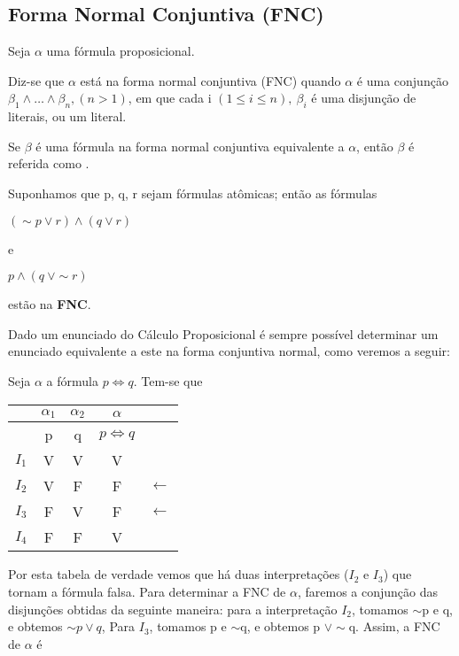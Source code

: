 \subsection{Forma Normal Conjuntiva (FNC)}

Seja $\alpha$ uma fórmula proposicional.

\begin{defi}
    Diz-se que $\alpha$ está na forma normal conjuntiva (FNC) quando $\alpha$ é uma conjunção $\beta_1 \land \dots \land \beta_n, (n > 1)$, em que cada i $(1 \leq i \leq n),\ \beta_i$ é uma disjunção de literais, ou um literal.
\end{defi}

\begin{defi}
    Se $\beta$ é uma fórmula na forma normal conjuntiva equivalente a $\alpha$, então $\beta$ é referida como .
\end{defi}

\setcounter{exemplo}{0}
\begin{exemplo}
    Suponhamos que p, q, r sejam fórmulas atômicas; então as fórmulas
    \begin{center}
        $(\sim p \lor r) \land (q \lor r)$

        e

        $p \land (q\ \lor \sim r)$
    \end{center}
\end{exemplo}

estão na \textbf{FNC}.

Dado um enunciado do Cálculo Proposicional é sempre possível determinar um enunciado equivalente a este na forma conjuntiva normal, como veremos a seguir:

\begin{exemplo}
    Seja $\alpha$ a fórmula $p \iff q$.
    Tem-se que
\end{exemplo}

\begin{tabular}{c | c c c l}
    & $\alpha_1$ & $\alpha_2$ & $\alpha$ & \\ \hline
    & p & q & $p \iff q$ & \\
    $I_1$ & V & V & V & \\
    $I_2$ & V & F & F & $\longleftarrow$ \\
    $I_3$ & F & V & F & $\longleftarrow$ \\
    $I_4$ & F & F & V &
\end{tabular}

\bigskip
Por esta tabela de verdade vemos que há duas interpretações ($I_2$ e $I_3$) que tornam a fórmula falsa.
Para determinar a FNC de $\alpha$, faremos a conjunção das disjunções obtidas da seguinte maneira: para a interpretação $I_2$, tomamos $\sim$p e q, e obtemos $\sim p \lor q$, Para $I_3$, tomamos p e $\sim$q, e obtemos p $\lor \sim$q.
Assim, a FNC de $\alpha$ é

